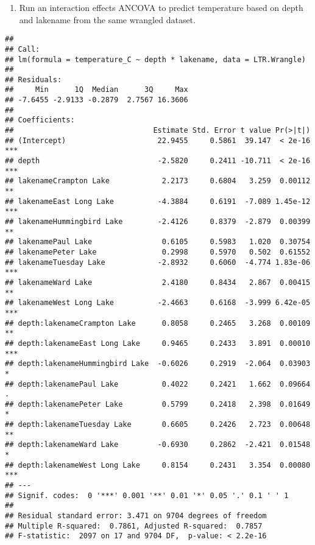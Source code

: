 \documentclass[]{article}
\newenvironment{Shaded}{\begin{snugshade}}{\end{snugshade}}
\newcommand{\CommentTok}[1]{\textcolor[rgb]{0.56,0.35,0.01}{\textit{#1}}}
\newcommand{\DataTypeTok}[1]{\textcolor[rgb]{0.13,0.29,0.53}{#1}}
\newcommand{\KeywordTok}[1]{\textcolor[rgb]{0.13,0.29,0.53}{\textbf{#1}}}
\newcommand{\NormalTok}[1]{#1}
\newcommand{\OperatorTok}[1]{\textcolor[rgb]{0.81,0.36,0.00}{\textbf{#1}}}
\newcommand{\StringTok}[1]{\textcolor[rgb]{0.31,0.60,0.02}{#1}}
\providecommand{\tightlist}{%
  \setlength{\itemsep}{0pt}\setlength{\parskip}{0pt}}
\begin{document}
\begin{enumerate}
\def\labelenumi{\arabic{enumi}.}
\setcounter{enumi}{5}
\tightlist
\item
  Run an interaction effects ANCOVA to predict temperature based on
  depth and lakename from the same wrangled dataset.
\end{enumerate}

\begin{Shaded}
\end{Shaded}

\begin{verbatim}
## 
## Call:
## lm(formula = temperature_C ~ depth * lakename, data = LTR.Wrangle)
## 
## Residuals:
##     Min      1Q  Median      3Q     Max 
## -7.6455 -2.9133 -0.2879  2.7567 16.3606 
## 
## Coefficients:
##                                Estimate Std. Error t value Pr(>|t|)    
## (Intercept)                     22.9455     0.5861  39.147  < 2e-16 ***
## depth                           -2.5820     0.2411 -10.711  < 2e-16 ***
## lakenameCrampton Lake            2.2173     0.6804   3.259  0.00112 ** 
## lakenameEast Long Lake          -4.3884     0.6191  -7.089 1.45e-12 ***
## lakenameHummingbird Lake        -2.4126     0.8379  -2.879  0.00399 ** 
## lakenamePaul Lake                0.6105     0.5983   1.020  0.30754    
## lakenamePeter Lake               0.2998     0.5970   0.502  0.61552    
## lakenameTuesday Lake            -2.8932     0.6060  -4.774 1.83e-06 ***
## lakenameWard Lake                2.4180     0.8434   2.867  0.00415 ** 
## lakenameWest Long Lake          -2.4663     0.6168  -3.999 6.42e-05 ***
## depth:lakenameCrampton Lake      0.8058     0.2465   3.268  0.00109 ** 
## depth:lakenameEast Long Lake     0.9465     0.2433   3.891  0.00010 ***
## depth:lakenameHummingbird Lake  -0.6026     0.2919  -2.064  0.03903 *  
## depth:lakenamePaul Lake          0.4022     0.2421   1.662  0.09664 .  
## depth:lakenamePeter Lake         0.5799     0.2418   2.398  0.01649 *  
## depth:lakenameTuesday Lake       0.6605     0.2426   2.723  0.00648 ** 
## depth:lakenameWard Lake         -0.6930     0.2862  -2.421  0.01548 *  
## depth:lakenameWest Long Lake     0.8154     0.2431   3.354  0.00080 ***
## ---
## Signif. codes:  0 '***' 0.001 '**' 0.01 '*' 0.05 '.' 0.1 ' ' 1
## 
## Residual standard error: 3.471 on 9704 degrees of freedom
## Multiple R-squared:  0.7861, Adjusted R-squared:  0.7857 
## F-statistic:  2097 on 17 and 9704 DF,  p-value: < 2.2e-16
\end{verbatim}
\end{document}
